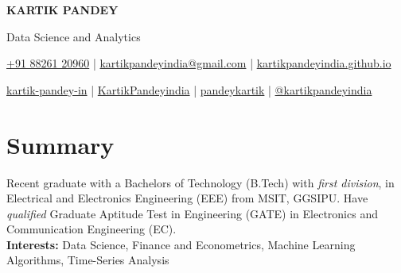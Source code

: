 \documentclass[a4paper,11pt]{article}
\newcommand{\socialicon}[1]{\raisebox{-0.05em}{\resizebox{!}{1em}{#1}}}
\newcommand{\ieeeicon}[1]{\raisebox{-0.3em}{\resizebox{!}{1.3em}{#1}}}
\newcommand{\headerfontx}{\fontfamily{bch}\selectfont} %
\begin{document}
\headerfontx

\begin{center}
    {\Huge\textbf{KARTIK PANDEY}}
\end{center}
\vspace{-6mm}

\begin{center}
    \small{Data Science and Analytics}
\end{center}
\vspace{-6mm}

\begin{center}
    \small{
    \href{tel:+918826120960}{ +91 88261 20960} | \href{mailto:kartikpandeyindia@gmail.com}{ kartikpandeyindia@gmail.com} | 
    \href{https://kartikpandeyindia.github.io/}{kartikpandeyindia.github.io}
    }
\end{center}
\vspace{-6mm}

\begin{center}
    \scriptsize{
    \socialicon{\faLinkedin} \href{https://www.linkedin.com/in/kartik-pandey-india}{kartik-pandey-in} | 
    \socialicon{\faGithub} \href{https://github.com/KartikPandeyindia}{KartikPandeyindia} | 
    \socialicon{\faKaggle}  \href{https://www.kaggle.com/pandeykartik}{pandeykartik} |
    \socialicon{\faMedium} \href{https://medium.com/@kartikpandeyindia}{@kartikpandeyindia}
    }
\end{center}

\vspace{-4mm}

\section{\textbf{Summary}}
\vspace{1mm}
\small{
Recent graduate with a Bachelors of Technology (B.Tech) with \textit{first division}, in Electrical and Electronics Engineering (EEE) from MSIT, GGSIPU. Have \textit{qualified} Graduate Aptitude Test in Engineering (GATE) in Electronics and Communication Engineering (EC). \\
\textbf{Interests: } Data Science, Finance and Econometrics, Machine Learning Algorithms, Time-Series Analysis 
}
\vspace{-2mm}
\end{document}
